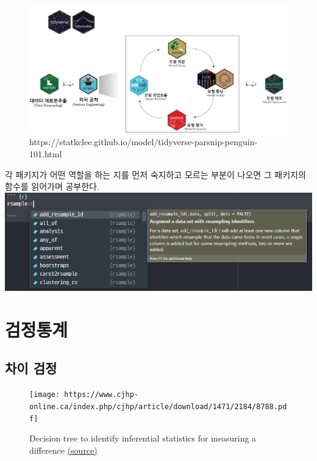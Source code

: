 \documentclass[
  letterpaper,
  DIV=11,
  numbers=noendperiod]{scrreprt}
\begin{document}
\begin{figure}

{\centering \includegraphics{./test/cheetsheet/tidymodels_overview.png}

}

\caption{https://statkclee.github.io/model/tidyverse-parsnip-penguin-101.html}

\end{figure}

각 패키지가 어떤 역할을 하는 지를 먼저 숙지하고 모르는 부분이 나오면 그
패키지의 함수를 읽어가며 공부한다.
\includegraphics{./image/ex_rsample.png}

\hypertarget{uxac80uxc815uxd1b5uxacc4}{%
\chapter*{검정통계}\label{uxac80uxc815uxd1b5uxacc4}}


\hypertarget{uxcc28uxc774-uxac80uxc815}{%
\section*{차이 검정}\label{uxcc28uxc774-uxac80uxc815}}


\begin{figure}

{\centering \texttt{[image: https://www.cjhp-online.ca/index.php/cjhp/article/download/1471/2184/8788.pdf]}

}

\caption{Decision tree to identify inferential statistics for measuring
a difference
\href{https://www.cjhp-online.ca/index.php/cjhp/article/download/1471/2184?inline=1}{(source)}}

\end{figure}
\end{document}
